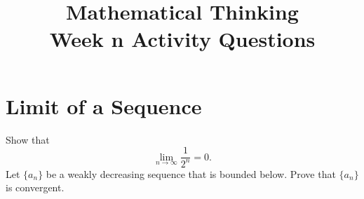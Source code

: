 \documentclass[12pt]{exam}
\title{Mathematical Thinking\\Week n Activity Questions}
\begin{document}
\maketitle
\tableofcontents
\section{Limit of a Sequence}
\begin{questions}
\question Show that
\begin{equation*}
    \lim_{n\to\infty} \frac{1}{2^n}= 0.
\end{equation*}
\question Let $\{a_n\}$ be a weakly decreasing sequence that is bounded below. Prove that $\{a_n\}$ is convergent.
\end{questions}
\end{document}
